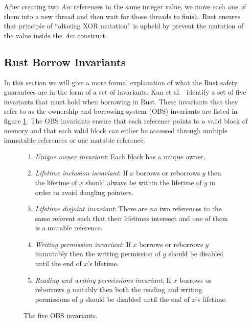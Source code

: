 After creating two \textit{Arc} references to the same integer value, we move each one of them into a new thread and then wait for those threads to finish.
Rust ensures that principle of ``aliasing XOR mutation'' is upheld by prevent the mutation of the value inside the \textit{Arc} construct.

\subsection{Rust Borrow Invariants}
\label{sec:obsinvariants}
In this section we will give a more formal explanation of what the Rust safety guarantees are in the form of a set of invariants.
Kan et al.\ \cite{kan2020executable} identify a set of five invariants that must hold when borrowing in Rust.
These invariants that they refer to as the ownership and borrowing system (OBS) invariants are listed in figure \ref{fig:obsinvariants}.
The OBS invariants ensure that each reference points to a valid block of memory and that each valid block can either be accessed through multiple immutable references or one mutable reference.

\begin{figure}[h]
\centering
\begin{enumerate}
    \item \textit{Unique owner invariant}: Each block has a unique owner.
    \item \textit{Lifetime inclusion invariant}: If $x$ borrows or reborrows $y$ then the lifetime of $x$ should always be within the lifetime of $y$ in order to avoid dangling pointers.
    \item \textit{Lifetime disjoint invariant}: There are \textit{no} two references to the same referent such that their lifetimes intersect and one of them is a mutable reference.
    \item \textit{Writing permission invariant}: If $x$ borrows or reborrows $y$ immutably then the writing permission of $y$ should be disabled until the end of $x$'s lifetime.
    \item \textit{Reading and writing permissions invariant}: If $x$ borrows or reborrows $y$ mutably then both the reading and writing permissions of $y$ should be disabled until the end of $x$'s lifetime.
\end{enumerate}
\caption{The five OBS invariants.\cite{kan2020executable}}
\label{fig:obsinvariants}
\end{figure}

